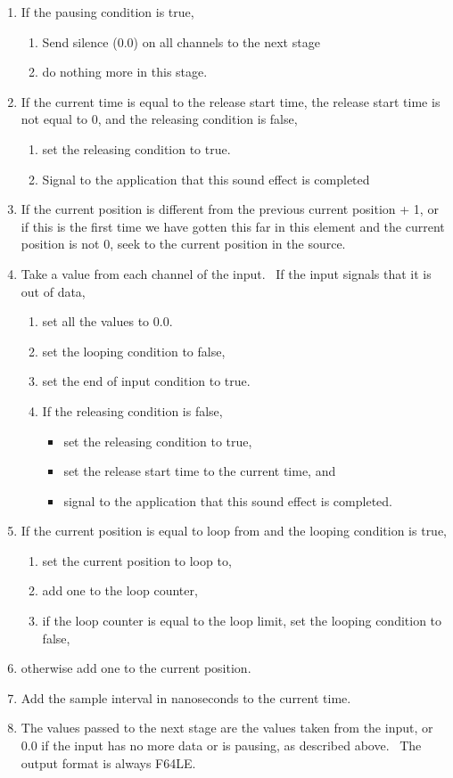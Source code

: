 \documentclass[letterpaper]{article}
\newcommand\liststyleLx{%
\renewcommand\theenumi{\arabic{enumi}}
\renewcommand\theenumii{\alph{enumii}}
\renewcommand\labelenumi{ \theenumi.}
\renewcommand\labelenumii{ \theenumii)}
\renewcommand\labelitemi{•}
\renewcommand\labelitemii{•}
}
\begin{document}
\liststyleLx
\begin{enumerate}
\item If the pausing condition is true,

\begin{enumerate}
\item Send silence (0.0) on all channels to the next stage
\item do nothing more in this stage.
\end{enumerate}
\item If the current time is equal to the release start time, the
release start time is not equal to 0, and the releasing condition is
false,

\begin{enumerate}
\item set the releasing condition to true.
\item Signal to the application that this sound effect is completed
\end{enumerate}
\item If the current position is different from the previous current
position + 1, or if this is the first time we have gotten this far in
this element and the current position is not 0, seek to the current
position in the source.
\item Take a value from each channel of the input. \ If the input
signals that it is out of data, 

\begin{enumerate}
\item set all the values to 0.0.
\item set the looping condition to false,
\item set the end of input condition to true.
\item If the releasing condition is false,

\begin{itemize}
\item set the releasing condition to true,
\item set the release start time to the current time, and
\item signal to the application that this sound effect is completed.
\end{itemize}
\end{enumerate}
\item If the current position is equal to loop from and the looping
condition is true, 

\begin{enumerate}
\item set the current position to loop to, 
\item add one to the loop counter, 
\item if the loop counter is equal to the loop limit, set the looping
condition to false,
\end{enumerate}
\item otherwise add one to the current position.
\item Add the sample interval in nanoseconds to the current time.
\item The values passed to the next stage are the values taken from the
input, or 0.0 if the input has no more data or is pausing, as described
above. \ The output format is always F64LE.
\end{enumerate}
\end{document}
